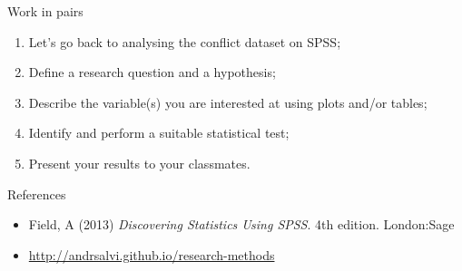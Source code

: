\documentclass[10pt]{beamer}   %
\begin{document}

\begin{frame}{Work in pairs}

\begin{enumerate}
    \item Let's go back to analysing the conflict dataset on SPSS;
    \item Define a research question and a hypothesis;
    \item Describe the variable(s) you are interested at using plots and/or tables;
    \item Identify and perform a suitable statistical test;
    \item Present your results to your classmates.
\end{enumerate}


\end{frame}



\begin{frame}{References}

\begin{itemize}
\item Field, A (2013) \textit{Discovering Statistics Using SPSS}. 4th edition. London:Sage

\item \url{http://andrsalvi.github.io/research-methods}

\end{itemize}

\end{frame}
\end{document}
